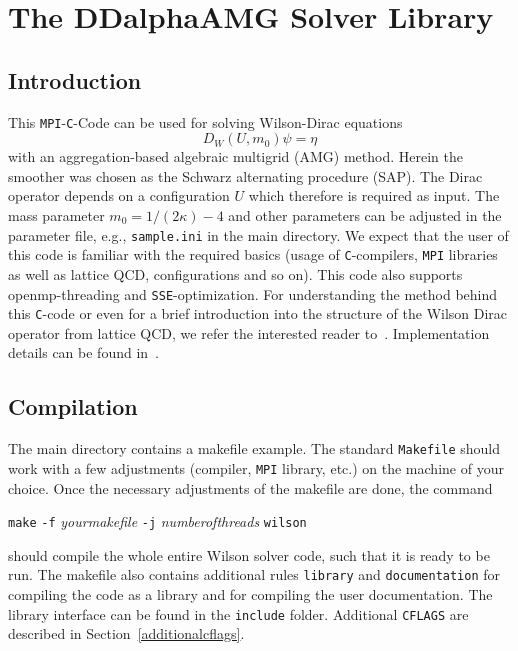 \documentclass[a4paper,12pt]{scrartcl}
\begin{document}
\section{The DDalphaAMG Solver Library}

\subsection{Introduction}
This \texttt{MPI}-\texttt{C}-Code can be used for solving Wilson-Dirac equations
\begin{equation*}
D_W(U,m_0) \psi = \eta
\end{equation*}
with an aggregation-based algebraic multigrid (AMG) method. Herein the smoother was chosen as the Schwarz alternating procedure (SAP). The Dirac operator depends on a configuration $U$ which therefore is required as input. The mass parameter $m_0 = 1/(2\kappa)-4$ and other parameters can be adjusted in the parameter file, e.g., \texttt{sample.ini} in the main directory. We expect that the user of this code is familiar with the required basics (usage of \texttt{C}-compilers, \texttt{MPI} libraries as well as lattice QCD, configurations and so on). This code also supports openmp-threading and \texttt{SSE}-optimization. For understanding the method behind this \texttt{C}-code or even for a brief introduction into the structure of the Wilson Dirac operator from lattice QCD, we refer the interested reader to~\cite{Frommer:2013kla,FroKaKrLeRo13,RottmannPhD}. Implementation details can be found in~\cite{RottmannPhD}.

\subsection{Compilation}\label{compile_wilson:ss}
The main directory contains a makefile example. The standard \texttt{Makefile} should work with a few adjustments (compiler, \texttt{MPI} library, etc.) on the machine of your choice. Once the necessary adjustments of the makefile are done, the command 
\begin{center}
\texttt{make} \texttt{-f} \textit{yourmakefile} \texttt{-j} \textit{numberofthreads} \texttt{wilson}
\end{center}
should compile the whole entire Wilson solver code, such that it is ready to be run. The makefile also contains additional rules \texttt{library} and \texttt{documentation} for compiling the code as a library and for compiling the user documentation. The library interface can be found in the \texttt{include} folder. Additional \texttt{CFLAGS} are described in Section~\ref{additionalcflags}. 
\end{document}
